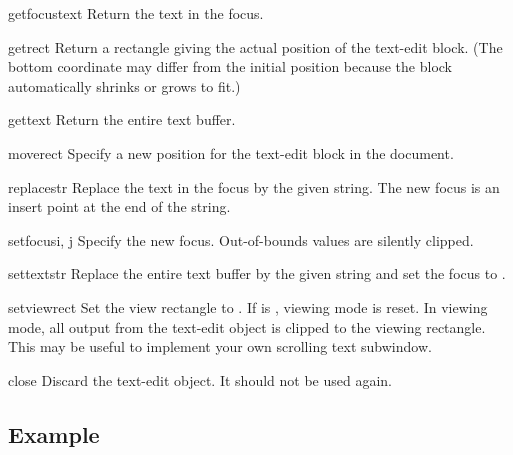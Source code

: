 \begin{methoddesc}{getfocustext}{}
Return the text in the focus.
\end{methoddesc}

\begin{methoddesc}{getrect}{}
Return a rectangle giving the actual position of the text-edit block.
(The bottom coordinate may differ from the initial position because
the block automatically shrinks or grows to fit.)
\end{methoddesc}

\begin{methoddesc}{gettext}{}
Return the entire text buffer.
\end{methoddesc}

\begin{methoddesc}{move}{rect}
Specify a new position for the text-edit block in the document.
\end{methoddesc}

\begin{methoddesc}{replace}{str}
Replace the text in the focus by the given string.
The new focus is an insert point at the end of the string.
\end{methoddesc}

\begin{methoddesc}{setfocus}{i, j}
Specify the new focus.
Out-of-bounds values are silently clipped.
\end{methoddesc}

\begin{methoddesc}{settext}{str}
Replace the entire text buffer by the given string and set the focus
to .
\end{methoddesc}

\begin{methoddesc}{setview}{rect}
Set the view rectangle to .  If  is ,
viewing mode is reset.  In viewing mode, all output from the text-edit
object is clipped to the viewing rectangle.  This may be useful to
implement your own scrolling text subwindow.
\end{methoddesc}

\begin{methoddesc}{close}{}
Discard the text-edit object.  It should not be used again.
\end{methoddesc}

\subsection{Example}

